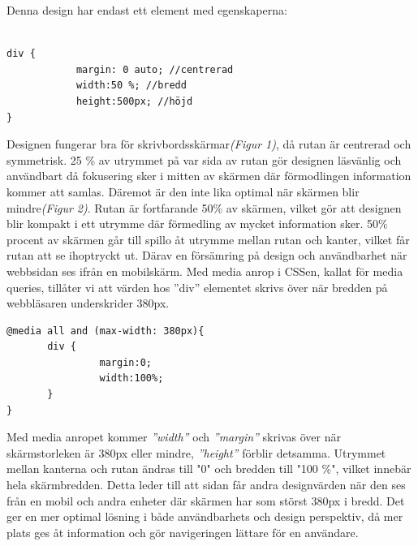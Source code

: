 \documentclass[11pt]{article}
\begin{document}
\vspace{1cm}
Denna design har endast ett element med egenskaperna:

\vspace{0.5cm}
\begin{verbatim}

div {	
	        margin: 0 auto; //centrerad
	        width:50 %; //bredd
	        height:500px; //höjd
}

\end{verbatim}

Designen fungerar bra för skrivbordsskärmar\textit{(Figur 1)}, då rutan är centrerad och symmetrisk. 25 \% av utrymmet på var sida av rutan gör designen läsvänlig och användbart då fokusering sker i mitten av skärmen där förmodlingen information kommer att samlas. Däremot är den inte lika optimal när skärmen blir mindre\textit{(Figur 2)}. Rutan är fortfarande 50\% av skärmen, vilket gör att  designen blir kompakt i ett utrymme där förmedling av mycket information sker. 50\% procent av skärmen går till spillo åt utrymme mellan rutan och kanter, vilket får rutan att se ihoptryckt ut. Därav en försämring på design och användbarhet när webbsidan ses ifrån en mobilskärm.
\newpage
Med media anrop i CSSen, kallat för media queries, tillåter vi att värden hos ”div” elementet skrivs över när bredden på webbläsaren underskrider 380px.

\vspace{0.5cm}
\begin{verbatim}
@media all and (max-width: 380px){
       div {
                margin:0;
                width:100%;
       }
}
\end{verbatim}
\vspace{0.5cm}

Med media anropet kommer \textit{”width”} och \textit{”margin”} skrivas över när skärmstorleken är 380px eller mindre, \textit{”height”} förblir detsamma. Utrymmet mellan kanterna och rutan ändras till "0" och bredden till "100 \%", vilket innebär hela skärmbredden. Detta leder till att sidan får andra designvärden när den ses från en mobil och andra enheter där skärmen har som störst 380px i bredd. Det ger en mer optimal lösning i både användbarhets och design perspektiv, då mer plats ges åt information och gör navigeringen lättare för en användare.
\end{document}
